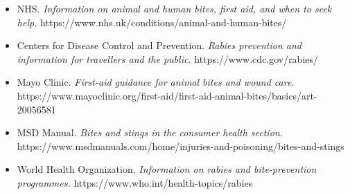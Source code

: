\begin{itemize}
    \item NHS. \textit{Information on animal and human bites, first aid, and when to seek help.} https://www.nhs.uk/conditions/animal-and-human-bites/
    \item Centers for Disease Control and Prevention. \textit{Rabies prevention and information for travellers and the public.} https://www.cdc.gov/rabies/
    \item Mayo Clinic. \textit{First-aid guidance for animal bites and wound care.} https://www.mayoclinic.org/first-aid/first-aid-animal-bites/basics/art-20056581
    \item MSD Manual. \textit{Bites and stings in the consumer health section.} https://www.msdmanuals.com/home/injuries-and-poisoning/bites-and-stings
    \item World Health Organization. \textit{Information on rabies and bite-prevention programmes.} https://www.who.int/health-topics/rabies
\end{itemize}
